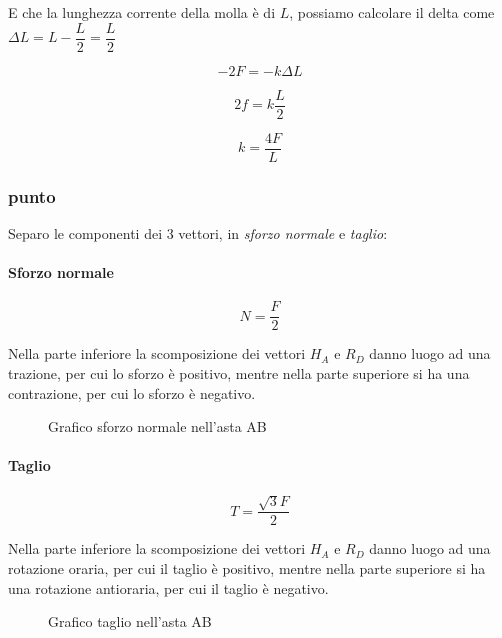 \documentclass[main.tex]{subfiles}
\begin{document}
E che la lunghezza corrente della molla è di $L$, possiamo calcolare il delta come $\Delta L = L - \dfrac{L}{2} = \dfrac{L}{2}$

\begin{equation}
	-2F = -k\Delta L
\end{equation}

\begin{equation}
	2f = k\dfrac{L}{2}
\end{equation}

\begin{equation}
	k = \dfrac{4F}{L}
\end{equation}

\subsubsection{punto}
Separo le componenti dei 3 vettori, in \textit{sforzo normale} e \textit{taglio}:

\paragraph{Sforzo normale}

\[
	N = \dfrac{F}{2}
\]

Nella parte inferiore la scomposizione dei vettori $H_A$ e $R_D$ danno luogo ad una trazione, per cui lo sforzo è positivo, mentre nella parte superiore si ha una contrazione, per cui lo sforzo è negativo.

\begin{figure}[H]
\centering
\resizebox{.3\textwidth}{!}{}
\caption{Grafico sforzo normale nell'asta AB}
\end{figure}

\paragraph{Taglio}

\[
	T = \dfrac{\sqrt{3}F}{2}
\]

Nella parte inferiore la scomposizione dei vettori $H_A$ e $R_D$ danno luogo ad una rotazione oraria, per cui il taglio è positivo, mentre nella parte superiore si ha una rotazione antioraria, per cui il taglio è negativo.

\begin{figure}[H]
\centering
\resizebox{.3\textwidth}{!}{}
\caption{Grafico taglio nell'asta AB}
\end{figure}
\end{document}
